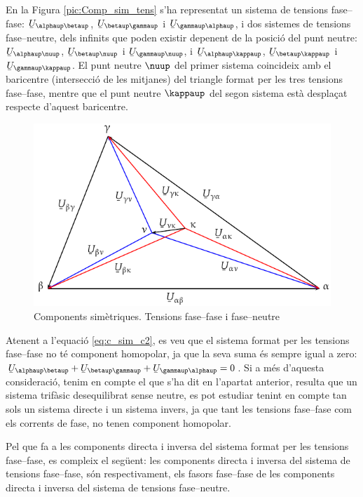 En la Figura \vref{pic:Comp_sim_tens} s'ha representat un sistema de
tensions fase--fase: $\cmplx{U}_{\alphaup\betaup}$,
$\cmplx{U}_{\betaup\gammaup}$ i $\cmplx{U}_{\gammaup\alphaup}$, i dos
sistemes de tensions fase--neutre, dels infinits que poden existir
depenent de la posici\'{o} del punt neutre: $\cmplx{U}_{\alphaup\nuup}$,
$\cmplx{U}_{\betaup\nuup}$ i $\cmplx{U}_{\gammaup\nuup}$, i
$\cmplx{U}_{\alphaup\kappaup}$, $\cmplx{U}_{\betaup\kappaup}$ i
$\cmplx{U}_{\gammaup\kappaup}$. El punt neutre $\nuup$ del primer sistema
coincideix amb el baricentre (intersecci\'{o} de les mitjanes) del
triangle  format per les tres tensions fase--fase, mentre que el
punt neutre $\kappaup$ del segon sistema est\`{a} despla\c{c}at respecte
d'aquest baricentre.
\begin{figure}[htb]
\centering
    \includegraphics{Imatges/Cap-CompSim-Tensions.pdf}
\caption{Components sim\`{e}triques. Tensions fase--fase i fase--neutre}
\label{pic:Comp_sim_tens}
\end{figure}

Atenent a l'equaci\'{o} \eqref{eq:c_sim_c2}, es veu que el sistema
format per les tensions fase--fase no t\'{e} component homopolar, ja que
la seva suma  \'{e}s sempre igual a zero: $\cmplx{U}_{\alphaup\betaup} +
\cmplx{U}_{\betaup\gammaup} + \cmplx{U}_{\gammaup\alphaup} = 0$. Si a m\'{e}s
d'aquesta consideraci\'{o}, tenim en compte el que s'ha dit en l'apartat
anterior, resulta que un sistema trif\`{a}sic desequilibrat sense
neutre, es pot estudiar tenint en compte tan sols un sistema directe
i un sistema invers, ja que tant les tensions fase--fase com els
corrents de fase, no tenen component homopolar.

Pel que fa a les components directa i inversa del sistema format per
les tensions fase--fase, es compleix el seg\"{u}ent: les components
directa i inversa del sistema de tensions fase--fase, s\'{o}n
respectivament, els fasors fase--fase de les components directa i
inversa del sistema de tensions fase--neutre.

